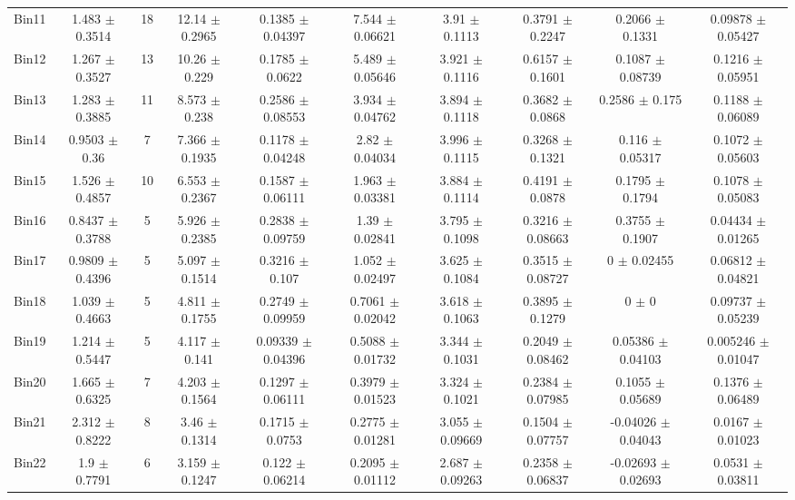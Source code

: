 \begin{tabular}{@{\extracolsep{4pt}}lccccccccc@{}}
     Bin11 & 1.483 $\pm$ 0.3514 & 18 & 12.14 $\pm$ 0.2965 & 0.1385 $\pm$ 0.04397 & 7.544 $\pm$ 0.06621 & 3.91 $\pm$ 0.1113 & 0.3791 $\pm$ 0.2247 & 0.2066 $\pm$ 0.1331 & 0.09878 $\pm$ 0.05427 \\ 
     Bin12 & 1.267 $\pm$ 0.3527 & 13 & 10.26 $\pm$ 0.229 & 0.1785 $\pm$ 0.0622 & 5.489 $\pm$ 0.05646 & 3.921 $\pm$ 0.1116 & 0.6157 $\pm$ 0.1601 & 0.1087 $\pm$ 0.08739 & 0.1216 $\pm$ 0.05951 \\ 
     Bin13 & 1.283 $\pm$ 0.3885 & 11 & 8.573 $\pm$ 0.238 & 0.2586 $\pm$ 0.08553 & 3.934 $\pm$ 0.04762 & 3.894 $\pm$ 0.1118 & 0.3682 $\pm$ 0.0868 & 0.2586 $\pm$ 0.175 & 0.1188 $\pm$ 0.06089 \\ 
     Bin14 & 0.9503 $\pm$ 0.36 & 7 & 7.366 $\pm$ 0.1935 & 0.1178 $\pm$ 0.04248 & 2.82 $\pm$ 0.04034 & 3.996 $\pm$ 0.1115 & 0.3268 $\pm$ 0.1321 & 0.116 $\pm$ 0.05317 & 0.1072 $\pm$ 0.05603 \\ 
     Bin15 & 1.526 $\pm$ 0.4857 & 10 & 6.553 $\pm$ 0.2367 & 0.1587 $\pm$ 0.06111 & 1.963 $\pm$ 0.03381 & 3.884 $\pm$ 0.1114 & 0.4191 $\pm$ 0.0878 & 0.1795 $\pm$ 0.1794 & 0.1078 $\pm$ 0.05083 \\ 
     Bin16 & 0.8437 $\pm$ 0.3788 & 5 & 5.926 $\pm$ 0.2385 & 0.2838 $\pm$ 0.09759 & 1.39 $\pm$ 0.02841 & 3.795 $\pm$ 0.1098 & 0.3216 $\pm$ 0.08663 & 0.3755 $\pm$ 0.1907 & 0.04434 $\pm$ 0.01265 \\ 
     Bin17 & 0.9809 $\pm$ 0.4396 & 5 & 5.097 $\pm$ 0.1514 & 0.3216 $\pm$ 0.107 & 1.052 $\pm$ 0.02497 & 3.625 $\pm$ 0.1084 & 0.3515 $\pm$ 0.08727 & 0 $\pm$ 0.02455 & 0.06812 $\pm$ 0.04821 \\ 
     Bin18 & 1.039 $\pm$ 0.4663 & 5 & 4.811 $\pm$ 0.1755 & 0.2749 $\pm$ 0.09959 & 0.7061 $\pm$ 0.02042 & 3.618 $\pm$ 0.1063 & 0.3895 $\pm$ 0.1279 & 0 $\pm$ 0 & 0.09737 $\pm$ 0.05239 \\ 
     Bin19 & 1.214 $\pm$ 0.5447 & 5 & 4.117 $\pm$ 0.141 & 0.09339 $\pm$ 0.04396 & 0.5088 $\pm$ 0.01732 & 3.344 $\pm$ 0.1031 & 0.2049 $\pm$ 0.08462 & 0.05386 $\pm$ 0.04103 & 0.005246 $\pm$ 0.01047 \\ 
     Bin20 & 1.665 $\pm$ 0.6325 & 7 & 4.203 $\pm$ 0.1564 & 0.1297 $\pm$ 0.06111 & 0.3979 $\pm$ 0.01523 & 3.324 $\pm$ 0.1021 & 0.2384 $\pm$ 0.07985 & 0.1055 $\pm$ 0.05689 & 0.1376 $\pm$ 0.06489 \\ 
     Bin21 & 2.312 $\pm$ 0.8222 & 8 & 3.46 $\pm$ 0.1314 & 0.1715 $\pm$ 0.0753 & 0.2775 $\pm$ 0.01281 & 3.055 $\pm$ 0.09669 & 0.1504 $\pm$ 0.07757 & -0.04026 $\pm$ 0.04043 & 0.0167 $\pm$ 0.01023 \\ 
     Bin22 & 1.9 $\pm$ 0.7791 & 6 & 3.159 $\pm$ 0.1247 & 0.122 $\pm$ 0.06214 & 0.2095 $\pm$ 0.01112 & 2.687 $\pm$ 0.09263 & 0.2358 $\pm$ 0.06837 & -0.02693 $\pm$ 0.02693 & 0.0531 $\pm$ 0.03811 \\ 

\end{tabular}
